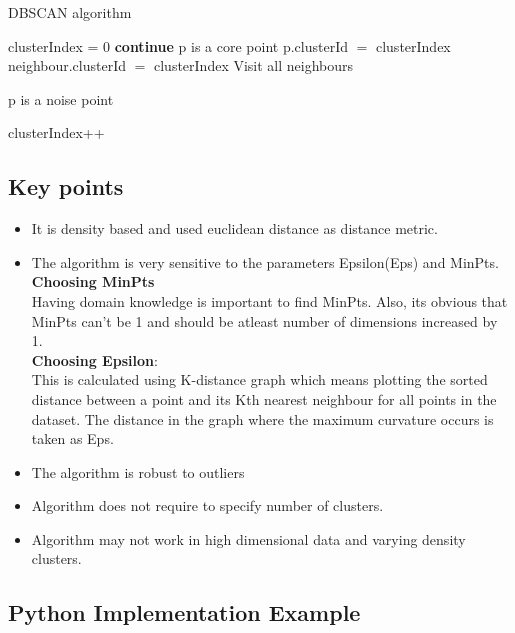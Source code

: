 \documentclass[12pt,letterpaper, onecolumn]{exam}
\begin{document}
\begin{algorithm}
\caption{DBSCAN algorithm}\label{cap}
\begin{algorithmic}

\State clusterIndex = 0
  \State \textbf{continue}
  \EndIf
  \State p is a core point 
  \State p.clusterId $=$ clusterIndex
  \State neighbour.clusterId $=$ clusterIndex
  \State Visit all neighbours
  \EndIf
  \EndIf
  \EndFor
 	
 	\Else
 	\State p is a noise point  
  
	\EndIf
\EndFor
\State clusterIndex++


\end{algorithmic}
\end{algorithm}


\subsection*{Key points}
\begin{itemize}
\item It is density based and used euclidean distance as distance metric.
\item The algorithm is very sensitive to the parameters Epsilon(Eps) and MinPts.
\\ \textbf{Choosing MinPts}\\
Having domain knowledge is important to find MinPts. Also, its obvious that MinPts can't be 1 and should be atleast number of dimensions increased by 1.
\\ \textbf{Choosing Epsilon}:\\
This is calculated using K-distance graph which means plotting the sorted distance between a point and its Kth nearest neighbour for all points in the dataset. The distance in the graph where the maximum curvature occurs is taken as Eps.

\item The algorithm is robust to outliers
\item Algorithm does not require to specify number of clusters.
\item Algorithm may not work in high dimensional data and varying density clusters.
\end{itemize}


\subsection*{Python Implementation Example}
\end{document}
